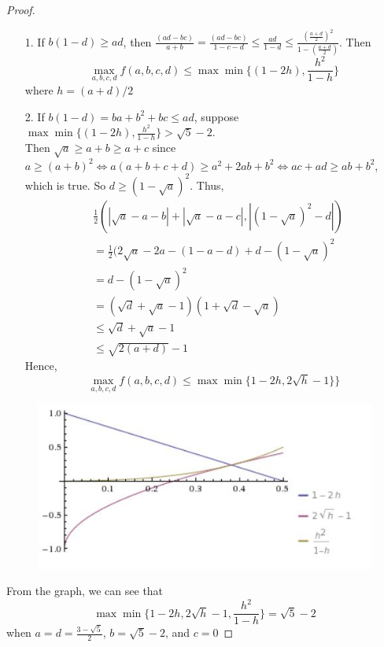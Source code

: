 \begin{proof}
\begin{itemize}
\item [1.] If $b(1-d) \geq ad$, then 
$\frac{(ad - bc)}{a+b} = \frac{(ad - bc)}{1-c-d} \leq \frac{ad}{1 - d} 
\leq \frac{(\frac{a+d}{2})^2}{1 - (\frac{a+d}{2})}$. Then 
$$\underset {a,b,c,d} {\max} f(a,b,c,d) \leq 
\max \min \{(1-2h), \frac{h^2}{1-h} \}$$
where $h = (a+d)/2$
\item [2.] If $b(1-d) = ba + b^2 + bc \leq ad$, suppose $\max \min \{(1-2h), \frac{h^2}{1-h} \} > \sqrt{5} -2$. \\
Then $\sqrt{a} \geq a + b \geq a + c$ since $a \geq (a+b)^2 \Leftrightarrow a(a+b+c+d) \geq a^2 + 2ab + b^2 \Leftrightarrow ac + ad \geq ab + b^2$, which is true. So $d \geq (1 -\sqrt{a})^2$. Thus, 
\begin{align*}
& \frac{1}{2}(| \sqrt{a} - a - b| + |\sqrt{a} - a - c|, |(1 - \sqrt{a})^2 -d|) \\
&= \frac{1}{2} (2 \sqrt{a} - 2a - (1 - a -d) + d - (1 - \sqrt{a})^2 \\
&= d - (1 - \sqrt{a})^2 \\
&= (\sqrt{d} + \sqrt{a} - 1)(1 + \sqrt{d} - \sqrt{a}) \\
&\leq \sqrt{d} + \sqrt{a} - 1\\
& \leq \sqrt{2(a+d)} - 1
\end{align*}
Hence, $$\underset {a,b,c,d} {\max} f(a,b,c,d) \leq 
\max \min \{1-2h, 2 \sqrt{h} -1 \} \}$$
\end{itemize}
\begin{figure}
	\centering
    \includegraphics[scale = 0.8]{graph.jpg}
\end{figure}
From the graph, we can see that 
$$\max \min \{1-2h, 2 \sqrt{h} -1, \frac{h^2}{1-h} \} = \sqrt{5} -2$$
when $a = d = \frac{3 - \sqrt{5}}{2}$, $b = \sqrt{5} - 2$, and $c = 0$
\end{proof}




